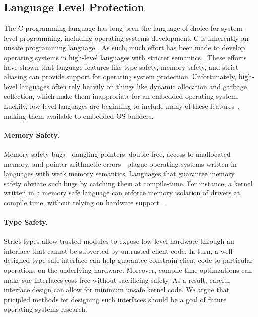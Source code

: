 \subsection{Language Level Protection}

The C programming language has long been the language of choice for system-level
programming, including operating systems development. C is inherently an unsafe
programming language \cite{kint:osdi2012, undefined:apsys2012}. As such, much
effort has been made to develop operating systems in high-level languages with
stricter semantics \cite{singularity:sigops, house:icfp2005, unikernels:2013}.
These efforts have shown that language features like type safety, memory safety,
and strict aliasing can provide support for operating system protection.
Unfortunately, high-level languages often rely heavily on things like dynamic
allocation and garbage collection, which make them inapproriate for an embedded
operating system. Luckily, low-level languages are beginning to include many of
these features~\cite{c++14,rust}, making them available to embedded OS builders.

\paragraph{Memory Safety.}
Memory safety bugs---dangling pointers, double-free, access to unallocated
memory, and pointer arithmetic errors---plague operating systems written in
languages with weak memory semantics.  Languages that guarantee memory safety
obviate such bugs by catching them at compile-time.  For instance, a kernel
written in a memory safe language can enforce memory isolation of drivers at
compile time, without relying on hardware support~\cite{spin:sosp}.

\paragraph{Type Safety.}
Strict types allow trusted modules to expose low-level hardware through an
interface that cannot be subverted by untrusted client-code. In turn, a well
designed type-safe interface can help guarantee constrain client-code to
particular operations on the underlying hardware. Moreover, compile-time
optimzations can make suc interfaces cost-free without sacrificing safety. As a
result, careful interface design can allow for minimum unsafe kernel code. We
argue that pricipled methods for designing such interfaces should be a goal of
future operating systems research.

